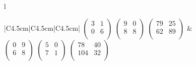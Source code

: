 \begin{przyklad}
\begin{figure}[H]
\begin{tabular}{l}
\begin{tabular}{|C{4.5cm}|C{4.5cm}|C{4.5cm}|}
\(\begin{pmatrix}
        3 & 1 \\
        0 & 6 \\    
\end{pmatrix}\)
\(\begin{pmatrix}
        9 & 0 \\
        8 & 8 \\    
\end{pmatrix}\)
\(\begin{pmatrix}
        79 & 25 \\
        62 & 89 \\    
\end{pmatrix}\) &
\(\begin{pmatrix}
        0 & 9 \\
        6 & 8 \\    
\end{pmatrix}\)
\(\begin{pmatrix}
        5 & 0 \\
        7 & 1 \\    
\end{pmatrix}\)
\(\begin{pmatrix}
        78 & 40 \\
        104 & 32 \\    
\end{pmatrix}\) \\
\hline
\end{tabular} 
\end{tabular}
\vspace{0.5cm}









\end{figure}
\end{przyklad}
